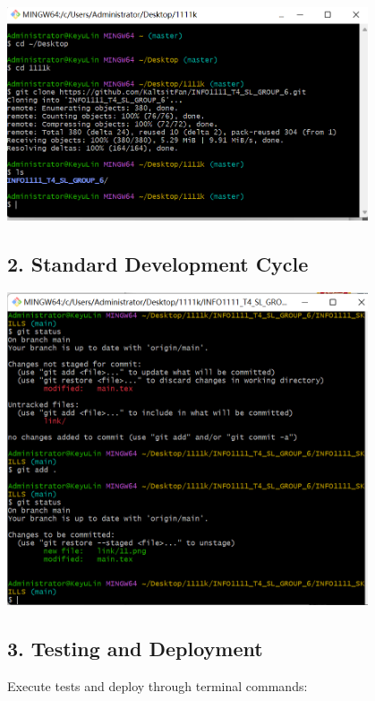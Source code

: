 \documentclass[a4paper, 11pt]{report}
\begin{document}
\begin{center}
\includegraphics[width=0.8\textwidth]{link/11.png}
\end{center}

\subsection*{2. Standard Development Cycle}

\begin{center}
\includegraphics[width=0.8\textwidth]{link/22.png}
\end{center}

\subsection*{3. Testing and Deployment}
Execute tests and deploy through terminal commands:
\end{document}
